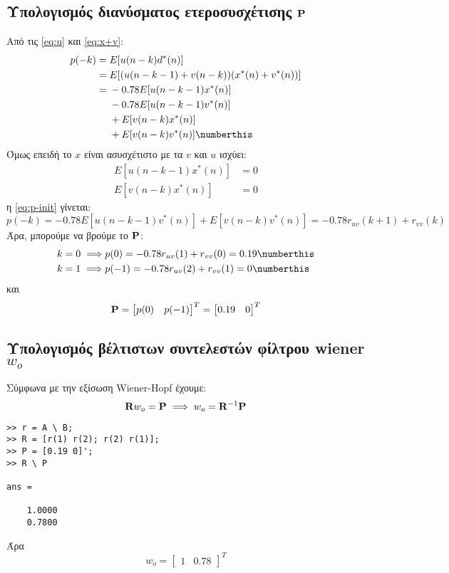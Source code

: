 \subsection{Υπολογισμός διανύσματος ετεροσυσχέτισης $\mathbf{P}$}
Από τις \eqref{eq:u} και \eqref{eq:x+v}:
\begin{align*}
p(-k) ={}& E[u(n - k) d^*(n)]\\
={}& E[(u(n - k - 1) + v(n - k)) (x^*(n) + v^*(n))]\\
={}& -0.78E[u(n - k - 1) x^*(n)]\\
& -0.78E[u(n - k - 1) v^*(n)]\\
& + E[v(n - k) x^*(n)]\\
& + E[v(n - k) v^*(n)]
\numberthis\label{eq:p-init}
\end{align*}
Όμως επειδή το $x$ είναι ασυσχέτιστο με τα $v$ και $u$ ισχύει:
\begin{align*}
E[u(n - k - 1) x^*(n)] &= 0\\
E[v(n - k) x^*(n)] &= 0
\end{align*}
η \eqref{eq:p-init} γίνεται:
\begin{equation}
p(-k) = -0.78E[u(n - k - 1) v^*(n)] + E[v(n - k) v^*(n)] = -0.78r_{uv}(k + 1) + r_{vv}(k)
\end{equation}
Άρα, μπορούμε να βρούμε το $\mathbf{P}$:
\begin{align*}
k = 0 \implies& p(0) = -0.78r_{uv}(1) + r_{vv}(0) = 0.19\numberthis\\
k = 1 \implies& p(-1) = -0.78r_{uv}(2) + r_{vv}(1) = 0\numberthis
\end{align*}
και
\begin{equation}
\mathbf{P} = \begin{bmatrix} p(0) & p(-1)\end{bmatrix}^T = \begin{bmatrix} 0.19 & 0\end{bmatrix}^T
\end{equation}

\subsection{Υπολογισμός βέλτιστων συντελεστών φίλτρου wiener $w_o$}
Σύμφωνα με την εξίσωση Wiener-Hopf έχουμε:
\begin{equation}
\mathbf{R} w_o = \mathbf{P} \implies w_o = \mathbf{R}^{-1}\mathbf{P}
\end{equation}
\begin{lstlisting}
>> r = A \ B;
>> R = [r(1) r(2); r(2) r(1)];
>> P = [0.19 0]';
>> R \ P

ans =

    1.0000
    0.7800
\end{lstlisting}
Άρα
\begin{equation}
w_o = \begin{bmatrix} 1 & 0.78\end{bmatrix}^T
\end{equation}
